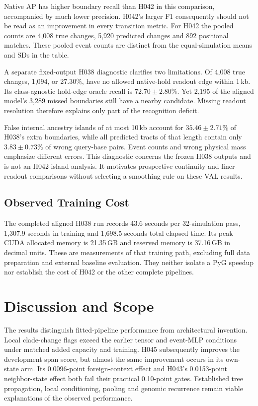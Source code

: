 \documentclass[letterpaper]{article}
\begin{document}
Native AP has higher boundary recall than H042 in this comparison, accompanied by much lower precision. H042's larger F1 consequently should not be read as an improvement in every transition metric. For H042 the pooled counts are 4,008 true changes, 5,920 predicted changes and 892 positional matches. These pooled event counts are distinct from the equal-simulation means and SDs in the table.

A separate fixed-output H038 diagnostic clarifies two limitations. Of 4,008 true changes, 1,094, or 27.30\%, have no allowed native-hold readout edge within 1\,kb. Its class-agnostic hold-edge oracle recall is $72.70\pm2.80\%$. Yet 2,195 of the aligned model's 3,289 missed boundaries still have a nearby candidate. Missing readout resolution therefore explains only part of the recognition deficit.

False internal ancestry islands of at most 10\,kb account for $35.46\pm2.71\%$ of H038's extra boundaries, while all predicted tracts of that length contain only $3.83\pm0.73\%$ of wrong query-base pairs. Event counts and wrong physical mass emphasize different errors. This diagnostic concerns the frozen H038 outputs and is not an H042 island analysis. It motivates prospective continuity and finer-readout comparisons without selecting a smoothing rule on these VAL results.

\subsection{Observed Training Cost}
The completed aligned H038 run records 43.6 seconds per 32-simulation pass, 1,307.9 seconds in training and 1,698.5 seconds total elapsed time. Its peak CUDA allocated memory is 21.35\,GB and reserved memory is 37.16\,GB in decimal units. These are measurements of that training path, excluding full data preparation and external baseline evaluation. They neither isolate a PyG speedup nor establish the cost of H042 or the other complete pipelines.

\section{Discussion and Scope}
The results distinguish fitted-pipeline performance from architectural invention. Local clade-change flags exceed the earlier tensor and event-MLP conditions under matched added capacity and training. H045 subsequently improves the development span score, but almost the same improvement occurs in its own-state arm. Its 0.0096-point foreign-context effect and H043's 0.0153-point neighbor-state effect both fail their practical 0.10-point gates. Established tree propagation, local conditioning, pooling and genomic recurrence remain viable explanations of the observed performance.
\end{document}
